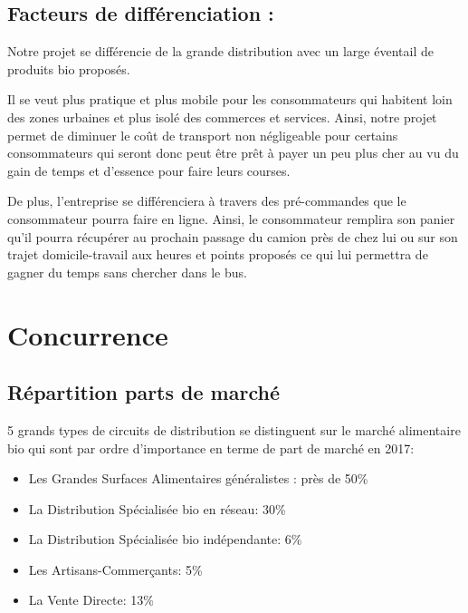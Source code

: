 \documentclass[12pt,a4paper]{report}
\begin{document}
			\newpage

		\section{Facteurs de différenciation :}
			
	Notre projet se différencie de la grande distribution avec un large éventail de produits bio proposés.
	
	Il se veut plus pratique et plus mobile pour les consommateurs qui habitent loin des zones urbaines et plus isolé des commerces et services. Ainsi, notre projet permet de diminuer le coût de transport non négligeable pour certains consommateurs qui seront donc peut être prêt à payer un peu plus cher au vu du gain de temps et d'essence pour faire leurs courses. 
	
	De plus, l'entreprise se différenciera à travers des pré-commandes que le consommateur pourra faire en ligne. Ainsi, le consommateur remplira son panier qu'il pourra récupérer au prochain passage du camion près de chez lui ou sur son trajet domicile-travail aux heures et points proposés ce qui lui permettra de gagner du temps sans chercher dans le bus.
		
		\chapter{Concurrence}
		
		
		\section{Répartition parts de marché}
	5 grands types de circuits de distribution se distinguent sur le marché alimentaire bio qui sont par ordre d'importance en terme de part de marché en 2017:
\begin{itemize}
\item Les Grandes Surfaces Alimentaires généralistes : près de 50\% 

\item La Distribution Spécialisée bio en réseau: 30\%

\item La Distribution Spécialisée bio indépendante: 6\%

\item Les Artisans-Commerçants: 5\%

\item La Vente Directe: 13\%
\end{itemize}
\end{document}
